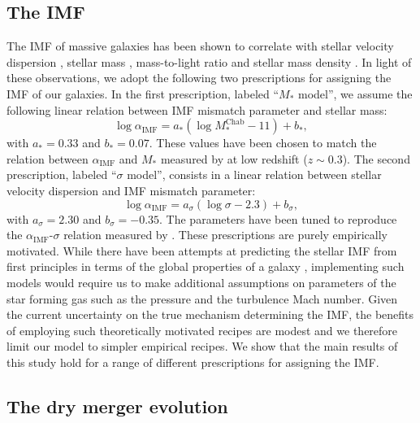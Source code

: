 \documentclass[usenatbib, letters]{mnras}
\def\mchab{M_*^{\mathrm{Chab}}}
\def\aimf{\alpha_{\mathrm{IMF}}}
\begin{document}
\subsection{The IMF}
\label{ssect:imfform}

The IMF of massive galaxies has been shown to correlate with stellar velocity dispersion \citep[e.g.]{Tre++10, CvD12, LaB++13, Spi++14, Pos++15}, stellar mass \citep{Aug++10b, Son++15}, mass-to-light ratio \citep{Cap++12} and stellar mass density \citep{Spi++15}.
In light of these observations, we adopt the following two prescriptions for assigning the IMF of our galaxies.
In the first prescription, labeled ``$M_*$ model'', we assume the following linear relation between IMF mismatch parameter and stellar mass:
\begin{equation}\label{eq:mstarmodel}
\log{\aimf} = a_*(\log{\mchab} - 11) + b_*,
\end{equation}
with $a_* = 0.33$ and $b_* = 0.07$. These values have been chosen to match the relation between $\aimf$ and $M_*$ measured by \citet{Son++15} at low redshift ($z\sim 0.3$).
The second prescription, labeled ``$\sigma$ model'', consists in a linear relation between stellar velocity dispersion and IMF mismatch parameter:
\begin{equation}\label{eq:sigmamodel}
\log{\aimf} = a_\sigma(\log{\sigma} - 2.3) + b_\sigma,
\end{equation}
with $a_\sigma = 2.30$ and $b_\sigma = -0.35$. The parameters have been tuned to reproduce the $\aimf$-$\sigma$ relation measured by \citet{Pos++15}.
These prescriptions are purely empirically motivated. While there have been attempts at predicting the stellar IMF from first principles in terms of the global properties of a galaxy \citep[e.g.]{Kru11,Hop12}, implementing such models would require us to make additional assumptions on parameters of the star forming gas such as the pressure and the turbulence Mach number.
Given the current uncertainty on the true mechanism determining the IMF, the benefits of employing such theoretically motivated recipes are modest and we therefore limit our model to simpler empirical recipes.
We show that the main results of this study hold for a range of different prescriptions for assigning the IMF.




\subsection{The dry merger evolution}
\end{document}
